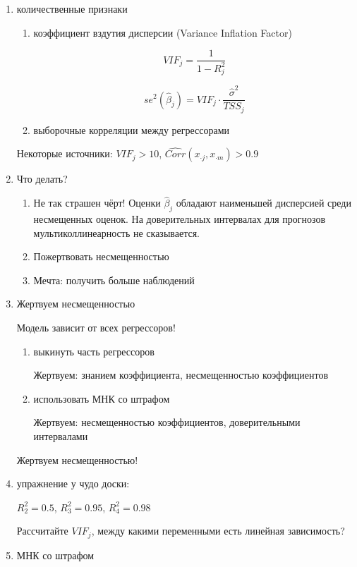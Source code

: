 \documentclass[12pt,a4paper]{article}
\begin{document}
{\begin{enumerate}
\item количественные признаки

\begin{enumerate}
\item коэффициент вздутия дисперсии (Variance Inflation Factor)

\[
VIF_j=\frac{1}{1-R^2_j}
\]

\[
se^2(\hat{\beta}_j)=VIF_j \cdot \frac{\hat{\sigma}^2}{TSS_j}
\]

\item выборочные корреляции между регрессорами
\end{enumerate}

Некоторые источники: $VIF_j > 10$, $\widehat{Corr}(x_{\cdot j},x_{\cdot m})>0.9$

\item Что делать?

\begin{enumerate}
\item Не так страшен чёрт! Оценки $\hat{\beta}_j$ обладают наименьшей дисперсией среди несмещенных оценок. На доверительных интервалах для прогнозов мультиколлинеарность не сказывается.
\item Пожертвовать несмещенностью
\item Мечта: получить больше наблюдений 
\end{enumerate}

\item Жертвуем несмещенностью

Модель зависит от всех регрессоров!

\begin{enumerate}
\item выкинуть часть регрессоров

Жертвуем: знанием коэффициента, несмещенностью коэффициентов

\item использовать МНК со штрафом 

Жертвуем: несмещенностью коэффициентов, доверительными интервалами
\end{enumerate}

Жертвуем несмещенностью!

\item упражнение у чудо доски:

$R^2_2=0.5$, $R^2_3=0.95$, $R^2_4=0.98$

Рассчитайте $VIF_j$, между какими переменными есть линейная зависимость?

\item МНК со штрафом 


\end{enumerate}}
\end{document}
